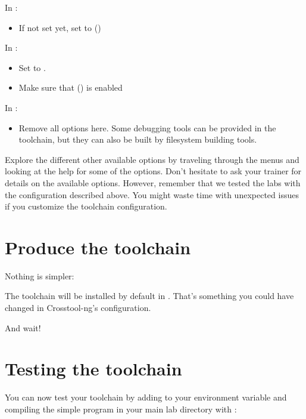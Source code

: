 In :
\begin{itemize}
  \item If not set yet, set  to 
        ()
\end{itemize}

In :
\begin{itemize}
  \item Set  to .
  \item Make sure that  () is enabled
\end{itemize}

In :
\begin{itemize}
\item Remove all options here. Some debugging tools can be provided
      in the toolchain, but they can also be built by filesystem
      building tools.
\end{itemize}

Explore the different other available options by traveling through the
menus and looking at the help for some of the options. Don't hesitate
to ask your trainer for details on the available options. However,
remember that we tested the labs with the configuration described
above. You might waste time with unexpected issues if you customize the
toolchain configuration.

\section{Produce the toolchain}

Nothing is simpler:


The toolchain will be installed by default in .
That's something you could have changed in Crosstool-ng's configuration.

And wait!

\section{Testing the toolchain}

You can now test your toolchain by adding
{} to your
 environment variable and compiling the simple
 program in your main lab directory with
:


